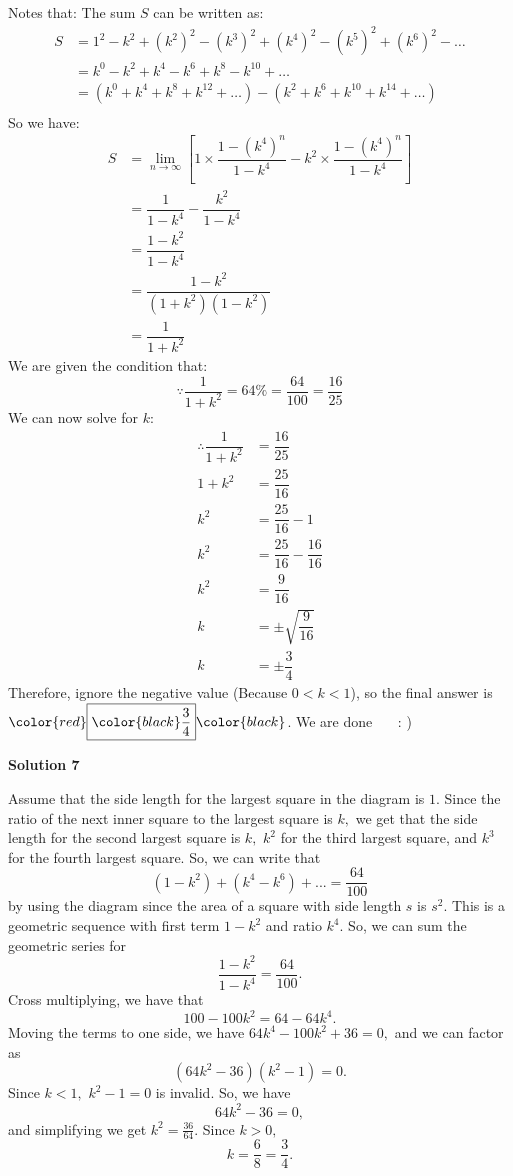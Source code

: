 \begin{enumerate}
Notes that: The sum $S$ can be written as:
 \begin{align*}     S &= 1^2 - k^2 + (k^2)^2 - (k^3)^2 + (k^4)^2 - (k^5)^2 + (k^6)^2 - \dots \\     &= k^0 - k^2 + k^4 - k^6 + k^8 - k^{10} + \dots \\     &= (k^0 + k^4 + k^8 + k^{12} + \dots) - (k^2 + k^6 + k^{10} + k^{14} + \dots) \\ \end{align*}
So we have: 
 \begin{align*}     S &= \lim_{n\rightarrow\infty}\left[1\times\dfrac{1-(k^4)^n}{1-k^4}-k^2\times\dfrac{1-(k^4)^n}{1-k^4}\right]\\     &= \dfrac{1}{1-k^4}-\dfrac{k^2}{1-k^4} \\     &= \dfrac{1-k^2}{1-k^4} \\     &= \dfrac{1-k^2}{(1+k^2)(1-k^2)} \\     &= \dfrac{1}{1+k^2} \end{align*}
We are given the condition that:
 \[\because \dfrac{1}{1+k^2}=64\%=\dfrac{64}{100}=\dfrac{16}{25}\]We can now solve for $k$:
 \begin{align*}   \therefore \dfrac{1}{1+k^2} &= \dfrac{16}{25} \\   1+k^2 &= \dfrac{25}{16} \\   k^2 &= \dfrac{25}{16} - 1 \\   k^2 &= \dfrac{25}{16} - \dfrac{16}{16} \\   k^2 &= \dfrac{9}{16} \\   k &= \pm\sqrt{\dfrac{9}{16}} \\   k &= \pm\dfrac{3}{4} \end{align*}
Therefore, ignore the negative value (Because \(0<k<1\)), so the final answer is $\color{red}\boxed{\color{black}\dfrac{3}{4}}\color{black}$. We are done ~~ : )

 



\textbf{Solution 7}

Assume that the side length for the largest square in the diagram is $1.$ Since the ratio of the next inner square to the largest square is $k,$ we get that the side length for the second largest square is $k,$ $k^2$ for the third largest square, and $k^3$ for the fourth largest square. So, we can write that 
 \[(1-k^2)+(k^4-k^6)+...=\frac{64}{100}\] by using the diagram since the area of a square with side length $s$ is $s^2.$ This is a geometric sequence with first term $1-k^2$ and ratio $k^4.$ So, we can sum the geometric series for 
 \[\frac{1-k^2}{1-k^4}=\frac{64}{100}.\] Cross multiplying, we have that 
 \[100-100k^2=64-64k^4.\] Moving the terms to one side, we have $64k^4-100k^2+36=0,$ and we can factor as 
 \[(64k^2-36)(k^2-1)=0.\] Since $k<1,$ $k^2-1=0$ is invalid. So, we have 
 \[64k^2-36=0,\] and simplifying we get $k^2=\frac{36}{64}.$ Since $k>0,$ 
 \[k=\frac{6}{8}=\boxed{\frac{3}{4}}.\]





\end{enumerate}
